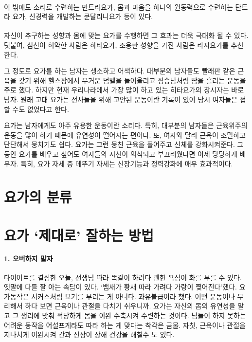 \documentclass[12pt, a4paper, oneside]{book}
\let\stdsection\section
\renewcommand\section{\newpage\stdsection}
\begin{document}
\paragraph{}
이 밖에도 소리로 수련하는 만트라요가, 몸과 마음을 하나의 원동력으로 수련하는 탄트라 요가, 신경력을 개발하는 쿤달리니요가 등이 있다.


\paragraph{}
자신이 추구하는 성향과 몸에 맞는 요가를 수행하면 그 효과는 더욱 극대화 될 수 있다. 덧붙여, 심신이 허약한 사람은 하타요가, 조용한 성향을 가진 사람은 라자요가를 추천한다.

그 정도로 요가를 하는 남자는 생소하고 어색하다. 대부분의 남자들도 빨래판 같은 근육을 갖기 위해 헬스장에서 무거운 덤벨을 들어올리고 짐승남처럼 땀을 흘리는 운동을 주로 했다. 하지만 현재 우리나라에서 가장 많이 하고 있는 히타요가의 창시자는 바로 남자. 원래 고대 요가는 전사들을 위해 고안된 운동이란 기록이 있어 당시 여자들은 접할 수도 없었다고 한다.

요가는 남자에게도 아주 유용한 운동이란 소리다. 특히, 대부분의 남자들은 근육위주의 운동을 많이 하기 때문에 유연성이 떨어지는 편이다. 또, 여자와 달리 근육이 조밀하고 단단해서 뭉치기도 쉽다. 요가는 그런 뭉친 근육을 풀어주고 신체를 강화시켜준다. 그 동안 요가를 배우고 싶어도 여자들의 시선이 의식되고 부끄러웠다면 이제 당당하게 배우자. 특히, 요가 자세 중 메뚜기 자세는 신장기능과 정력강화에 매우 효과적이다. 



\section{요가의 분류}




\section{요가 ‘제대로’ 잘하는 방법 }



 
\paragraph{1. 오버하지 말자 }
다이어트를 결심한 오늘, 선생님 따라 똑같이 하려다 괜한 욕심이 화를 부를 수 있다. 옛말에 다들 잘 아는 속담이 있다. ‘뱁새가 황새 따라 가려다 가랑이 찢어진다’했다. 요가동작은 서커스처럼 묘기를 부리는 게 아니다. 과유불급이라 했다. 어떤 운동이나 무리해서 하다 보면 근육이나 관절을 다치기 쉬우니까. 요가는 자신의 몸의 유연성을 알고 그 생리에 맞춰 적당하게 몸을 이완 수축시켜 수련하는 것이다. 남들이 하지 못하는 어려운 동작을 어설프게라도 따라 하는 게 맞다는 착각은 금물. 자칫, 근육이나 관절을 지나치게 이완시켜 간과 신장이 상해 건강을 해칠수 도 있다.
\end{document}
